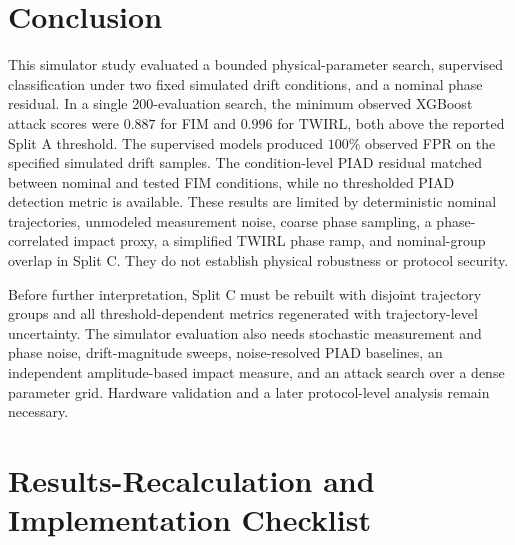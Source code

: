 \documentclass[journal,twocolumn]{IEEEtran}
\begin{document}
\section{Conclusion}
\label{sec:conclusion}

This simulator study evaluated a bounded physical-parameter search, supervised
classification under two fixed simulated drift conditions, and a nominal phase
residual. In a single 200-evaluation search, the minimum observed XGBoost attack
scores were $0.887$ for FIM and $0.996$ for TWIRL, both above the reported Split A
threshold. The supervised models produced $100\%$ observed FPR on the specified
simulated drift samples. The condition-level PIAD residual matched between nominal
and tested FIM conditions, while no thresholded PIAD detection metric is available.
These results are
limited by deterministic nominal trajectories, unmodeled measurement noise, coarse
phase sampling, a phase-correlated impact proxy, a simplified TWIRL phase ramp, and
nominal-group overlap in Split C. They do not establish physical robustness or
protocol security.

Before further interpretation, Split C must be rebuilt with disjoint trajectory
groups and all threshold-dependent metrics regenerated with trajectory-level
uncertainty. The simulator evaluation also needs stochastic measurement and phase
noise, drift-magnitude sweeps, noise-resolved PIAD baselines, an independent
amplitude-based impact measure, and an attack search over a dense parameter grid.
Hardware validation and a later protocol-level analysis remain necessary.

\appendix
\section{Results-Recalculation and Implementation Checklist}
\label{app:recalculation}
\end{document}
